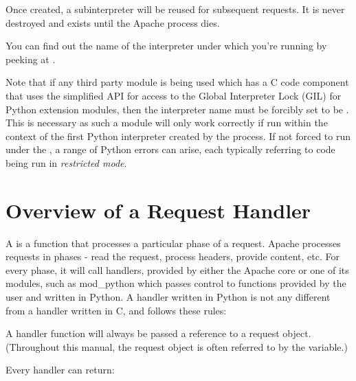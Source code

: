 Once created, a subinterpreter will be reused for subsequent requests.
It is never destroyed and exists until the Apache process dies.

You can find out the name of the interpreter under which you're
running by peeking at .

Note that if any third party module is being used which has a C code
component that uses the simplified API for access to the Global
Interpreter Lock (GIL) for Python extension modules, then the interpreter
name must be forcibly set to be . This is necessary
as such a module will only work correctly if run within the context of
the first Python interpreter created by the process. If not forced to
run under the , a range of Python errors can arise,
each typically referring to code being run in \emph{restricted mode}.

\begin{seealso}
\end{seealso}

\section{Overview of a Request Handler\label{pyapi-handler}}

A  is a function that processes a particular phase of a
request. Apache processes requests in phases - read the request,
process headers, provide content, etc. For every phase, it will call
handlers, provided by either the Apache core or one of its modules,
such as mod_python which passes control to functions provided by the
user and written in Python. A handler written in Python is not any
different from a handler written in C, and follows these rules:

  A handler function will always
be passed a reference to a request object. (Throughout this manual,
the request object is often referred to by the  variable.)

Every handler can return:

